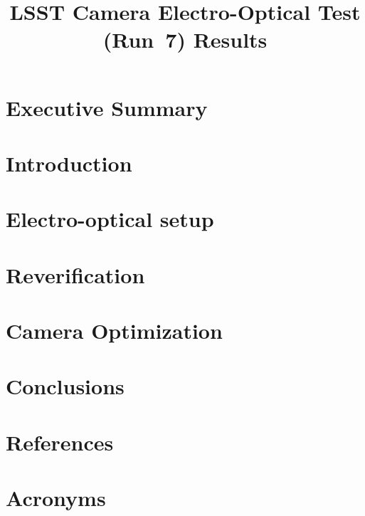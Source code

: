 \documentclass[SE,lsstdraft,authoryear,toc]{lsstdoc}
\title{LSST Camera Electro-Optical Test (Run~7) Results}
\date{\vcsDate}
\begin{document}
\maketitle

\section{Executive Summary}



\section{Introduction}


\section{Electro-optical setup}\label{sec:electro-optical-setup}



\section{Reverification}\label{sec:reverification}



\section{Camera Optimization}\label{sec:camera-optimization}




\section{Conclusions}\label{conclusions}



\appendix

\clearpage

\section{References} \label{sec:bib}
\renewcommand{\refname}{} %

\clearpage

\section{Acronyms} \label{sec:acronyms}

\end{document}
